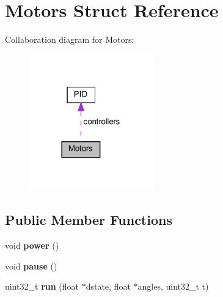 \hypertarget{structMotors}{}\section{Motors Struct Reference}
\label{structMotors}


Collaboration diagram for Motors\+:\nopagebreak
\begin{figure}[H]
\begin{center}
\leavevmode
\includegraphics[width=153pt]{structMotors__coll__graph}
\end{center}
\end{figure}
\subsection*{Public Member Functions}
\begin{DoxyCompactItemize}
\item 
\mbox{\label{structMotors_ac6532a754e5f1743ee4975b6722b4054}} 
void {\bfseries power} ()
\item 
\mbox{\label{structMotors_a179c6a24115935994a13493f74f56df8}} 
void {\bfseries pause} ()
\item 
\mbox{\label{structMotors_a0d3909ec9fadbb3028368e7340a2e707}} 
uint32\+\_\+t {\bfseries run} (float $\ast$dstate, float $\ast$angles, uint32\+\_\+t t)
\end{DoxyCompactItemize}
